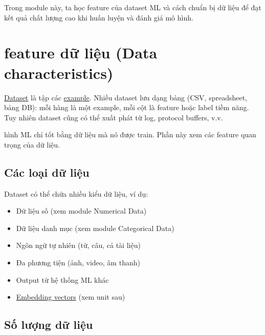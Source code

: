 \documentclass[12pt,a4paper]{article}
\begin{document}
\begin{ynghia}
Trong module này, ta học feature của dataset ML và cách chuẩn bị dữ liệu để đạt kết quả chất lượng cao khi huấn luyện và đánh giá mô hình.
\end{ynghia}

\section{feature dữ liệu (Data characteristics)}

\begin{dinhnghia}[title={Dataset và example}]
\href{https://developers.google.com/machine-learning/glossary\#dataset}{Dataset} là tập các \href{https://developers.google.com/machine-learning/glossary\#example}{example}. Nhiều dataset lưu dạng bảng (CSV, spreadsheet, bảng DB): mỗi hàng là một example, mỗi cột là feature hoặc label tiềm năng. Tuy nhiên dataset cũng có thể xuất phát từ log, protocol buffers, v.v.
\end{dinhnghia}

\begin{dongco} hình ML chỉ tốt bằng dữ liệu mà nó được train. Phần này xem các feature quan trọng của dữ liệu.\n\end{dongco}

\subsection{Các loại dữ liệu}

Dataset có thể chứa nhiều kiểu dữ liệu, ví dụ:
\begin{itemize}
  \item Dữ liệu số (xem module Numerical Data)
  \item Dữ liệu danh mục (xem module Categorical Data)
  \item Ngôn ngữ tự nhiên (từ, câu, cả tài liệu)
  \item Đa phương tiện (ảnh, video, âm thanh)
  \item Output từ hệ thống ML khác
  \item \href{https://developers.google.com/machine-learning/glossary\#embedding-vector}{Embedding vectors} (xem unit sau)
\end{itemize}

\subsection{Số lượng dữ liệu}
\end{document}
